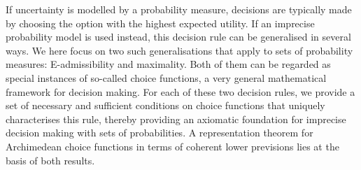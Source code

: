
If uncertainty is modelled by a probability measure, decisions are typically made by choosing the option with the highest expected utility. If an imprecise probability model is used instead, this decision rule can be generalised in several ways. We here focus on two such generalisations that apply to sets of probability measures: E-admissibility and maximality. Both of them can be regarded as special instances of so-called choice functions, a very general mathematical framework for decision making. For each of these two decision rules, we provide a set of necessary and sufficient conditions on choice functions that uniquely characterises this rule, thereby providing an axiomatic foundation for imprecise decision making with sets of probabilities. A representation theorem for Archimedean choice functions in terms of coherent lower previsions lies at the basis of both results.


